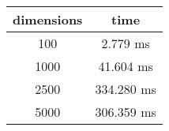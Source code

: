 \documentclass{article}
\begin{document}
\begin{table}
\begin{tabular}{|c|c|}\hline
\textbf{dimensions} & \textbf{time}\\ \hline
100
 & 2.779 ms\\ \hline
1000
 & 41.604 ms\\ \hline
2500
 & 334.280 ms\\ \hline
5000
 & 306.359 ms\\ \hline
\end{tabular}
\end{table}
\end{document}
